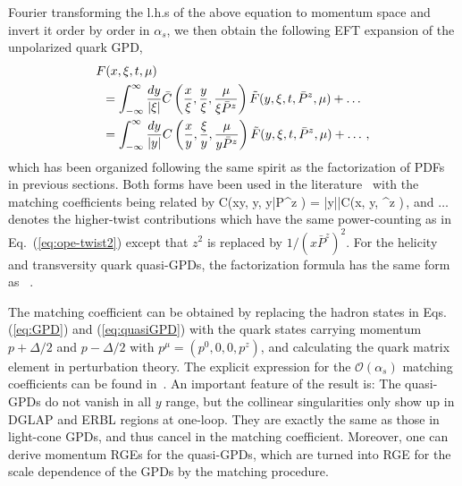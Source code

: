 Fourier transforming the l.h.s of the above equation to momentum space and invert it order by order in $\alpha_s$, we then obtain the following EFT expansion of the unpolarized quark GPD,
\begin{align}\label{eq:gpdfact}
	&F(x,\xi,t,\mu) \\
	&\hspace{0.5em}=  \int_{-\infty}^\infty {dy\over |\xi|}\bar{C}\left({x\over \xi}, {y\over \xi}, {\mu \over \xi {\bar P}^z }\right){\tilde F}(y,\xi,t, {\bar P}^z,\mu) +\ldots\nonumber\\
	&\hspace{0.5em}= \int_{-\infty}^\infty {dy\over |y|}C\left({x\over y}, {\xi\over y}, {\mu \over y{\bar P}^z }\right){\tilde F}(y,\xi,t,{\bar P}^z,\mu)+ \ldots\,,\nonumber
\end{align}
which has been organized following the same spirit as the factorization of PDFs in previous sections. Both forms have been used in the literature~\cite{Ji:2015qla,Xiong:2015nua,Liu:2019urm} with the matching coefficients being related by
\beq
C\left({x\over y}, {\xi\over y}, {\mu \over y{\bar P}^z }\right) = \left|{y\over \xi}\right|\bar{C}\left({x\over \xi}, {y\over \xi}, {\mu \over {}^z }\right)\,,
\eeq
and $\ldots$ denotes the higher-twist contributions which have the same power-counting as in Eq.~(\ref{eq:ope-twist2}) except that $z^2$ is replaced by $1/(x{\bar P}^z)^2$. For the helicity and transversity quark quasi-GPDs, the factorization formula has the same form as ~\cite{Liu:2019urm}.

The matching coefficient can be obtained by replacing the hadron states in Eqs. (\ref{eq:GPD}) and (\ref{eq:quasiGPD}) with the quark states carrying momentum $p+\Delta/2$ and $p-\Delta/2$ with $p^\mu=(p^0,0,0,p^z)$, and calculating the quark matrix element in perturbation theory.
%
The explicit expression for the $\mathcal O(\alpha_s)$ matching coefficients can be found in~\cite{Liu:2019urm}.
%
An important feature of the result is: The quasi-GPDs do not vanish in all $y$ range, but the collinear singularities only show up in DGLAP and ERBL regions at one-loop. They are exactly the same as those in light-cone GPDs, and thus cancel in the matching coefficient. Moreover, one can derive momentum RGEs for the quasi-GPDs,
which are turned into RGE for the scale dependence of the GPDs by
the matching procedure.


